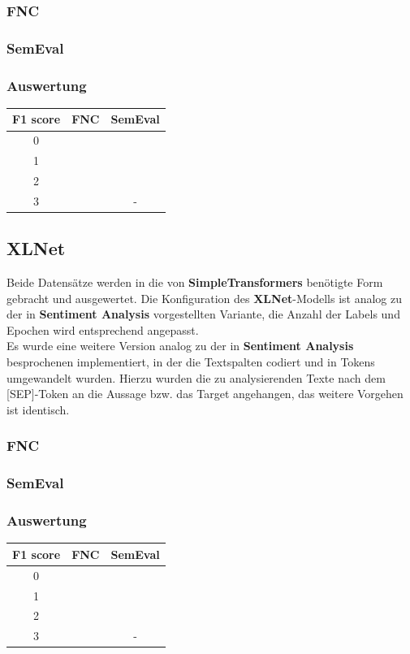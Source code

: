 \subsubsection*{FNC}

\subsubsection*{SemEval}

\subsubsection*{Auswertung}
\begin{center}
\begin{tabular}{|c||c|c|}
\hline
F1 score & FNC & SemEval\\ 
\hline\hline
0 &  & \\
\hline
1 &  & \\ 
\hline
2 &  & \\
\hline
3 &  & -\\
\hline    
\end{tabular}
\end{center}

\subsection{XLNet}
Beide Datens\"atze werden in die von \textbf{SimpleTransformers} ben\"otigte Form gebracht und ausgewertet. Die Konfiguration des \textbf{XLNet}-Modells ist analog zu der in \textbf{Sentiment Analysis} vorgestellten Variante, die Anzahl der Labels und Epochen wird entsprechend angepasst.\\
Es wurde eine weitere Version analog zu der in \textbf{Sentiment Analysis} besprochenen implementiert, in der die Textspalten codiert und in Tokens umgewandelt wurden. Hierzu wurden die zu analysierenden Texte nach dem [SEP]-Token an die Aussage bzw. das Target angehangen, das weitere Vorgehen ist identisch.

\subsubsection*{FNC}

\subsubsection*{SemEval}

\subsubsection*{Auswertung}
\begin{center}
\begin{tabular}{|c||c|c|}
\hline
F1 score & FNC & SemEval\\ 
\hline\hline
0 &  & \\
\hline
1 &  & \\ 
\hline
2 &  & \\
\hline
3 &  & -\\
\hline    
\end{tabular}
\end{center}
